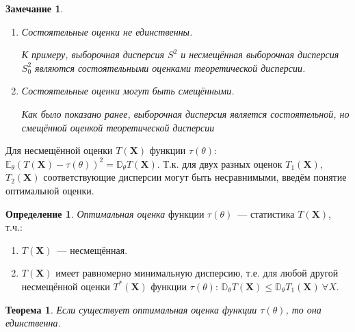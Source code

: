 \documentclass[oneside,final,14pt]{extreport}
\newtheorem{thm}{Теорема}[section]
\newtheorem*{rmrk}{Замечание}
\theoremstyle{definition}
\newtheorem{defn}{Определение}[section]
\begin{document}
\begin{rmrk}
\begin{enumerate}
    \item Состоятельные оценки не единственны.
    
    К примеру, выборочная дисперсия $S^{2}$ и несмещённая выборочная дисперсия $S_0^{2}$ являются состоятельными оценками теоретической дисперсии.
    
    \item Состоятельные оценки могут быть смещёнными.
    
    Как было показано ранее, выборочная дисперсия является состоятельной, но смещённой оценкой теоретической дисперсии
    
    \end{enumerate}
\end{rmrk}

Для несмещённой оценки $T(\mathbf{X})$ функции $\tau(\theta)$: $\mathbb{E}_{\theta}(T(\mathbf{X})-\tau(\theta))^{2}=\mathbb{D}_{\theta} T(\mathbf{X})$. Т.к. для двух разных оценок $T_1(\mathbf{X})$, $T_2(\mathbf{X})$ соответствующие дисперсии могут быть несравнимыми, введём понятие оптимальной оценки.

\begin{defn}
{\it Оптимальная оценка} функции $\tau(\theta)$~--- статистика $T(\mathbf{X})$, т.ч.:
\begin{enumerate}
    \item $T(\mathbf{X})$~--- несмещённая.
    \item $T(\mathbf{X})$ имеет равномерно минимальную дисперсию, т.е. для любой другой несмещённой оценки $T^{*}(\mathbf{X})$ функции $\tau(\theta)$: $\mathbb{D}_{\theta} T(\mathbf{X}) \leq \mathbb{D}_{\theta} T_{1}(\mathbf{X})~ \forall X$.
\end{enumerate}
\end{defn}
\pagebreak
\begin{thm}
Если существует оптимальная оценка функции $\tau(\theta)$, то она единственна.
\end{thm}
\end{document}
